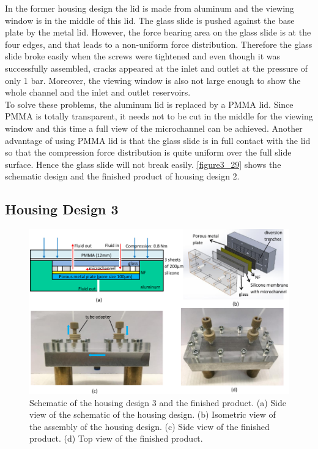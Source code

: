 In the former housing design the lid is made from aluminum and the viewing window is in the middle of this lid. The glass slide is pushed against the base plate by the metal lid. However, the force bearing area on the glass slide is at the four edges, and that leads to a non-uniform force distribution. Therefore the glass slide broke easily when the screws were tightened and even though it was successfully assembled, cracks appeared at the inlet and outlet at the pressure of only 1 bar. Moreover, the viewing window is also not large enough to show the whole channel and the inlet and outlet reservoirs.\\

To solve these problems, the aluminum lid is replaced by a PMMA lid. Since PMMA is totally transparent, it needs not to be cut in the middle for the viewing window and this time a full view of the microchannel can be achieved. Another advantage of using PMMA lid is that the glass slide is in full contact with the lid so that the compression force distribution is quite uniform over the full slide surface. Hence the glass slide will not break easily. \autoref{figure3_29} shows the schematic design and the finished product of housing design 2.

\subsection{Housing Design 3}
\label{3_5_3}
\begin{figure}[t]%
\centering
\includegraphics[width=1\textwidth]{figures/designandfabrication/figure3_30}%
\caption{Schematic of the housing design 3 and the finished product. (a) Side view of the schematic of the housing design. (b) Isometric view of the assembly of the housing design. (c) Side view of the finished product. (d) Top view of the finished product.}%
\label{figure3_30}%
\end{figure}

